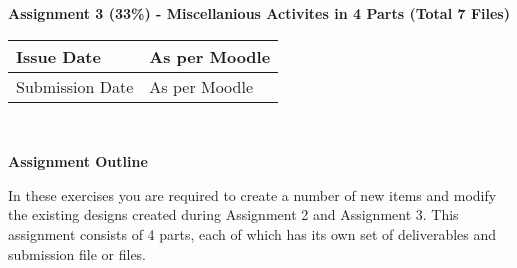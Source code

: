 
	
\begin{flushleft}
\Large\textbf{Assignment 3 (33\%) - Miscellanious Activites in 4 Parts (Total 7 Files)}\\
\end{flushleft}

\begin{tabular}{|l|l|}
	\hline 
	Issue Date & As per Moodle \\ 
	\hline 
	Submission Date & As per Moodle \\ 
	\hline 
\end{tabular} 
\\
\begin{flushleft}
\large\textbf{Assignment Outline}\\
\end{flushleft}


In these exercises you are required to create a number of new items and modify the existing designs created during Assignment 2 and Assignment 3.  This assignment consists of 4 parts, each of which has its own set of deliverables and submission file or files.

